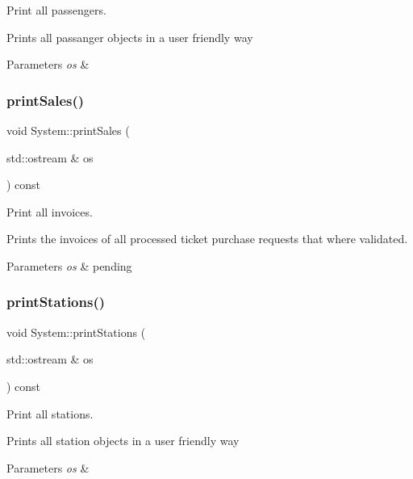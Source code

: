 Print all passengers. 

Prints all passanger objects in a user friendly way


\begin{DoxyParams}{Parameters}
{\em os} & \\
\hline
\end{DoxyParams}
\mbox{\label{classSystem_aaad47fd0e1bf746a0bed32feb9553e53}} 
\subsubsection{\texorpdfstring{print\+Sales()}{printSales()}}
{\footnotesize\ttfamily void System\+::print\+Sales (\begin{DoxyParamCaption}\item[{std\+::ostream \&}]{os }\end{DoxyParamCaption}) const}



Print all invoices. 

Prints the invoices of all processed ticket purchase requests that where validated.


\begin{DoxyParams}{Parameters}
{\em os} & pending \\
\hline
\end{DoxyParams}
\mbox{\label{classSystem_ac4b65c4fe2628e7d35b1027161e9d1da}} 
\subsubsection{\texorpdfstring{print\+Stations()}{printStations()}}
{\footnotesize\ttfamily void System\+::print\+Stations (\begin{DoxyParamCaption}\item[{std\+::ostream \&}]{os }\end{DoxyParamCaption}) const}



Print all stations. 

Prints all station objects in a user friendly way


\begin{DoxyParams}{Parameters}
{\em os} & \\
\hline
\end{DoxyParams}
\mbox{\label{classSystem_af4610f38d80e01a18f2083a7c5fbd5ce}} 

